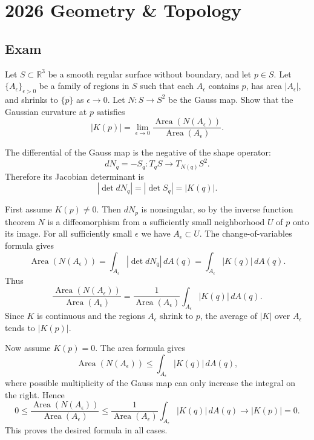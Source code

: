 \section{2026 Geometry \& Topology}

\subsection{Exam}

\begin{exercise}
\label{geometry:2026:1}
Let $S \subset \mathbb{R}^3$ be a smooth regular surface without boundary, and let
$p \in S$. Let $\{A_{\epsilon}\}_{\epsilon>0}$ be a family of regions in $S$ such
that each $A_{\epsilon}$ contains $p$, has area $|A_{\epsilon}|$, and shrinks to
$\{p\}$ as $\epsilon \to 0$. Let $N:S\to S^2$ be the Gauss map. Show that the
Gaussian curvature at $p$ satisfies
\[
    |K(p)|=\lim_{\epsilon\to 0}
    \frac{\operatorname{Area}(N(A_{\epsilon}))}
         {\operatorname{Area}(A_{\epsilon})}.
\]
\end{exercise}

\begin{solution}
The differential of the Gauss map is the negative of the shape operator:
\[
    dN_q=-S_q:T_qS\longrightarrow T_{N(q)}S^2.
\]
Therefore its Jacobian determinant is
\[
    |\det dN_q|=|\det S_q|=|K(q)|.
\]

First assume $K(p)\neq 0$. Then $dN_p$ is nonsingular, so by the inverse function
theorem $N$ is a diffeomorphism from a sufficiently small neighborhood $U$ of $p$
onto its image. For all sufficiently small $\epsilon$ we have $A_{\epsilon}\subset U$.
The change-of-variables formula gives
\[
    \operatorname{Area}(N(A_{\epsilon}))
    =\int_{A_{\epsilon}} |\det dN_q|\,dA(q)
    =\int_{A_{\epsilon}} |K(q)|\,dA(q).
\]
Thus
\[
    \frac{\operatorname{Area}(N(A_{\epsilon}))}
         {\operatorname{Area}(A_{\epsilon})}
    =
    \frac{1}{\operatorname{Area}(A_{\epsilon})}
    \int_{A_{\epsilon}} |K(q)|\,dA(q).
\]
Since $K$ is continuous and the regions $A_{\epsilon}$ shrink to $p$, the average
of $|K|$ over $A_{\epsilon}$ tends to $|K(p)|$.

Now assume $K(p)=0$. The area formula gives
\[
    \operatorname{Area}(N(A_{\epsilon}))
    \leq \int_{A_{\epsilon}} |K(q)|\,dA(q),
\]
where possible multiplicity of the Gauss map can only increase the integral on the
right. Hence
\[
    0\leq
    \frac{\operatorname{Area}(N(A_{\epsilon}))}
         {\operatorname{Area}(A_{\epsilon})}
    \leq
    \frac{1}{\operatorname{Area}(A_{\epsilon})}
    \int_{A_{\epsilon}} |K(q)|\,dA(q)\longrightarrow |K(p)|=0.
\]
This proves the desired formula in all cases.
\end{solution}

